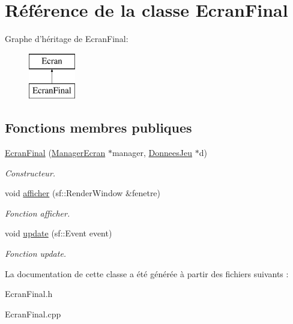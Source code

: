 \hypertarget{classEcranFinal}{\section{\-Référence de la classe \-Ecran\-Final}
\label{classEcranFinal}
}
\-Graphe d'héritage de \-Ecran\-Final\-:\begin{figure}[H]
\begin{center}
\leavevmode
\includegraphics[height=2.000000cm]{classEcranFinal}
\end{center}
\end{figure}
\subsection*{\-Fonctions membres publiques}
\begin{DoxyCompactItemize}
\item 
\hypertarget{classEcranFinal_aceb5934bfd3afcf020a6628e00538a56}{\hyperlink{classEcranFinal_aceb5934bfd3afcf020a6628e00538a56}{\-Ecran\-Final} (\hyperlink{classManagerEcran}{\-Manager\-Ecran} $\ast$manager, \hyperlink{classDonneesJeu}{\-Donnees\-Jeu} $\ast$d)}\label{classEcranFinal_aceb5934bfd3afcf020a6628e00538a56}

\begin{DoxyCompactList}\small\item\em \-Constructeur. \end{DoxyCompactList}\item 
\hypertarget{classEcranFinal_a1643c9d5712d527559d05ba548e7e6fc}{void \hyperlink{classEcranFinal_a1643c9d5712d527559d05ba548e7e6fc}{afficher} (sf\-::\-Render\-Window \&fenetre)}\label{classEcranFinal_a1643c9d5712d527559d05ba548e7e6fc}

\begin{DoxyCompactList}\small\item\em \-Fonction afficher. \end{DoxyCompactList}\item 
\hypertarget{classEcranFinal_a35714c3da483c95442106381041b53a6}{void \hyperlink{classEcranFinal_a35714c3da483c95442106381041b53a6}{update} (sf\-::\-Event event)}\label{classEcranFinal_a35714c3da483c95442106381041b53a6}

\begin{DoxyCompactList}\small\item\em \-Fonction update. \end{DoxyCompactList}\end{DoxyCompactItemize}


\-La documentation de cette classe a été générée à partir des fichiers suivants \-:\begin{DoxyCompactItemize}
\item 
\-Ecran\-Final.\-h\item 
\-Ecran\-Final.\-cpp\end{DoxyCompactItemize}
